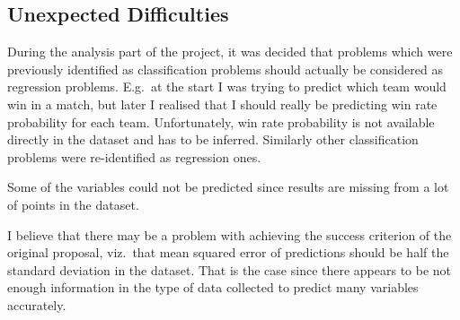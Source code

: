 \documentclass[11pt, a4paper]{article}
\begin{document}
\subsection*{Unexpected Difficulties}
During the analysis part of the project, it was decided that problems which were previously identified as classification problems should actually be considered as regression problems.
E.g.\ at the start I was trying to predict which team would win in a match, but later I realised that I should really be predicting win rate probability for each team.
Unfortunately, win rate probability is not available directly in the dataset and has to be inferred.
Similarly other classification problems were re-identified as regression ones.

Some of the variables could not be predicted since results are missing from a lot of points in the dataset.
  
I believe that there may be a problem with achieving the success criterion of the original proposal, viz.\ that mean squared error of predictions should be half the standard deviation in the dataset.
That is the case since there appears to be not enough information in the type of data collected to predict many variables accurately.
\end{document}
